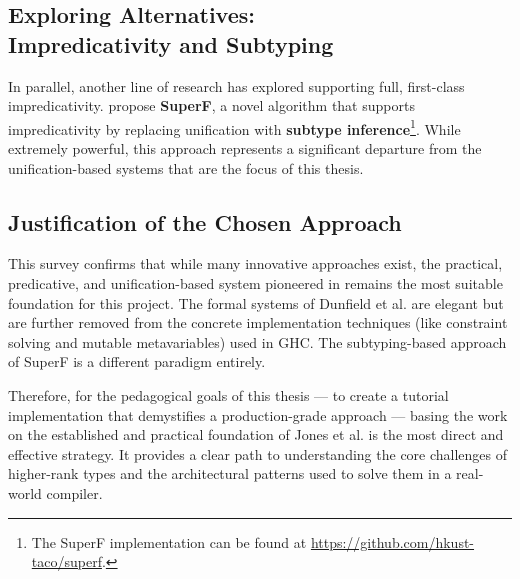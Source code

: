 \subsection{Exploring Alternatives: \\ Impredicativity and Subtyping}

In parallel, another line of research has explored supporting full, first-class impredicativity. \citeauthor{parreaux-when-2024} \cite{parreaux-when-2024} propose \textbf{SuperF}, a novel algorithm that supports impredicativity by replacing unification with \textbf{subtype inference}\footnote{The SuperF implementation can be found at \url{https://github.com/hkust-taco/superf}.}. While extremely powerful, this approach represents a significant departure from the unification-based systems that are the focus of this thesis.

\subsection{Justification of the Chosen Approach}

This survey confirms that while many innovative approaches exist, the practical, predicative, and unification-based system pioneered in \cite{jones-practical-2007} remains the most suitable foundation for this project. The formal systems of Dunfield et al. are elegant but are further removed from the concrete implementation techniques (like constraint solving and mutable metavariables) used in GHC. The subtyping-based approach of SuperF is a different paradigm entirely.

Therefore, for the pedagogical goals of this thesis --- to create a tutorial implementation that demystifies a production-grade approach --- basing the work on the established and practical foundation of Jones et al. is the most direct and effective strategy. It provides a clear path to understanding the core challenges of higher-rank types and the architectural patterns used to solve them in a real-world compiler.